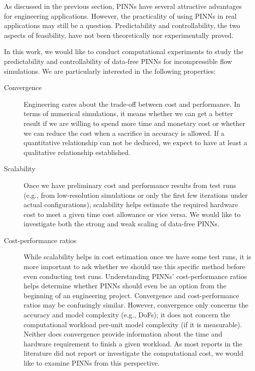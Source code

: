 
As discussed in the previous section, PINNs have several attractive advantages for engineering applications.
However, the practicality of using PINNs in real applications may still be a question.
Predictability and controllability, the two aspects of feasibility, have not been theoretically nor experimentally proved.

In this work, we would like to conduct computational experiments to study the predictability and controllability of data-free PINNs for incompressible flow simulations.
We are particularly interested in the following properties:

\begin{description}
    \item[Convergence]
        Engineering cares about the trade-off between cost and performance.
        In terms of numerical simulations, it means whether we can get a better result if we are willing to spend more time and monetary cost or whether we can reduce the cost when a sacrifice in accuracy is allowed.
        If a quantitative relationship can not be deduced, we expect to have at least a qualitative relationship established.
    \item[Scalability]
        Once we have preliminary cost and performance results from test runs (e.g., from low-resolution simulations or only the first few iterations under actual configurations), scalability helps estimate the required hardware cost to meet a given time cost allowance or vice versa.
        We would like to investigate both the strong and weak scaling of data-free PINNs.
    \item[Cost-performance ratios]
        While scalability helps in cost estimation once we have some test runs, it is more important to ask whether we should use this specific method before even conducting test runs.
        Understanding PINNs' cost-performance ratios helps determine whether PINNs should even be an option from the beginning of an engineering project.
        Convergence and cost-performance ratios may be confusingly similar.
        However, convergence only concerns the accuracy and model complexity (e.g., DoFs); it does not concern the computational workload per-unit model complexity (if it is measurable).
        Neither does convergence provide information about the time and hardware requirement to finish a given workload.
        As most reports in the literature did not report or investigate the computational cost, we would like to examine PINNs from this perspective.

\end{description}
